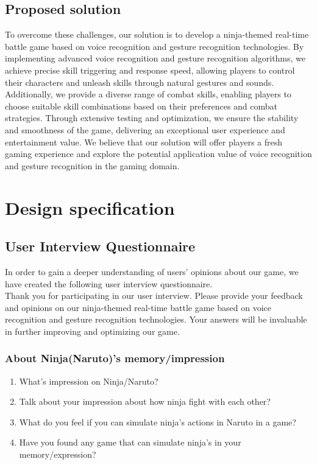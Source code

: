 \documentclass[UTF8,a4paper,12pt]{ctexart}
\numberwithin{equation}{section}
\begin{document}
\subsection{Proposed solution}
To overcome these challenges, our solution is to develop a ninja-themed real-time battle game based on voice recognition and gesture recognition technologies. By implementing advanced voice recognition and gesture recognition algorithms, we achieve precise skill triggering and response speed, allowing players to control their characters and unleash skills through natural gestures and sounds. Additionally, we provide a diverse range of combat skills, enabling players to choose suitable skill combinations based on their preferences and combat strategies. Through extensive testing and optimization, we ensure the stability and smoothness of the game, delivering an exceptional user experience and entertainment value. We believe that our solution will offer players a fresh gaming experience and explore the potential application value of voice recognition and gesture recognition in the gaming domain.

\newpage
{}
\section{Design specification}
\subsection{User Interview Questionnaire}
In order to gain a deeper understanding of users' opinions about our game, we have created the following user interview questionnaire.\\

Thank you for participating in our user interview. Please provide your feedback and opinions on our ninja-themed real-time battle game based on voice recognition and gesture recognition technologies. Your answers will be invaluable in further improving and optimizing our game.

\subsubsection{About Ninja(Naruto)'s memory/impression}
\begin{enumerate}
    \item What's impression on Ninja/Naruto?
    \item Talk about your impression about how ninja fight with each other?
    \item What do you feel if you can simulate ninja’s actions in Naruto  in a game?
    \item Have you found any game that can simulate ninja's in your memory/expression?
\end{enumerate}
\end{document}

